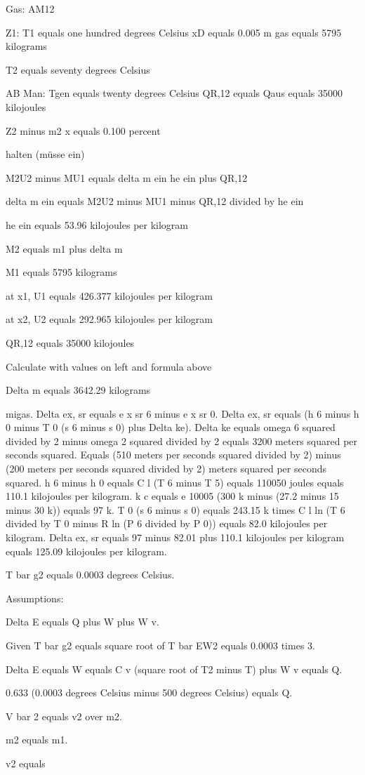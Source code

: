 Gas: AM12

Z1:
T1 equals one hundred degrees Celsius
xD equals 0.005
m gas equals 5795 kilograms

T2 equals seventy degrees Celsius

AB Man: Tgen equals twenty degrees Celsius
QR,12 equals Qaus equals 35000 kilojoules

Z2 minus m2
x equals 0.100 percent

halten (müsse ein)

M2U2 minus MU1 equals delta m ein he ein plus QR,12

delta m ein equals M2U2 minus MU1 minus QR,12 divided by he ein

he ein equals 53.96 kilojoules per kilogram

M2 equals m1 plus delta m

M1 equals 5795 kilograms

at x1, U1 equals 426.377 kilojoules per kilogram

at x2, U2 equals 292.965 kilojoules per kilogram

QR,12 equals 35000 kilojoules

Calculate with values on left and formula above

Delta m equals 3642.29 kilograms

migas.  
Delta ex, sr equals e x sr 6 minus e x sr 0.  
Delta ex, sr equals (h 6 minus h 0 minus T 0 (s 6 minus s 0) plus Delta ke).  
Delta ke equals omega 6 squared divided by 2 minus omega 2 squared divided by 2 equals 3200 meters squared per seconds squared.  
Equals (510 meters per seconds squared divided by 2) minus (200 meters per seconds squared divided by 2) meters squared per seconds squared.  
h 6 minus h 0 equals C l (T 6 minus T 5) equals 110050 joules equals 110.1 kilojoules per kilogram.  
k c equals e 10005 (300 k minus (27.2 minus 15 minus 30 k)) equals 97 k.  
T 0 (s 6 minus s 0) equals 243.15 k times C l ln (T 6 divided by T 0 minus R ln (P 6 divided by P 0)) equals 82.0 kilojoules per kilogram.  
Delta ex, sr equals 97 minus 82.01 plus 110.1 kilojoules per kilogram equals 125.09 kilojoules per kilogram.

T bar g2 equals 0.0003 degrees Celsius.

Assumptions:

Delta E equals Q plus W plus W v.

Given T bar g2 equals square root of T bar EW2 equals 0.0003 times 3.

Delta E equals W equals C v (square root of T2 minus T) plus W v equals Q.

0.633 (0.0003 degrees Celsius minus 500 degrees Celsius) equals Q.

V bar 2 equals v2 over m2.

m2 equals m1.

v2 equals